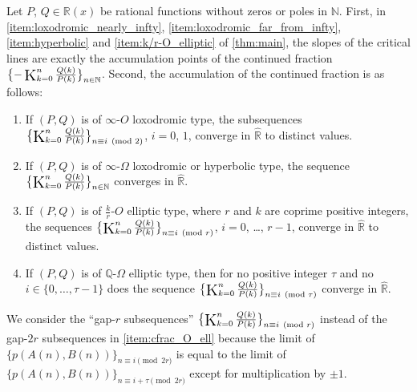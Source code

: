 \documentclass[a4paper,UKenglish,cleveref,autoref,thm-restate]{lipics-v2021}
\newcommand{\R}{\mathbb{R}}
\newcommand{\N}{\mathbb{N}}
\newcommand{\Q}{\mathbb{Q}}
\newcommand\Kettenbruch{\operatornamewithlimits{\mathchoice
     {\vcenter{\hbox{\huge $\mathrm{K}$}}}
     {\vcenter{\hbox{\Large $\mathrm{K}$}}}
     {\mathrm{K}}
     {\mathrm{K}}}}
\begin{document}
\begin{theorem}\label{thm:subcfrac_converge}
Let $P$, $Q \in \R(x)$ be rational functions without zeros or poles in $\N$. First, in \eqref{item:loxodromic_nearly_infty}, \eqref{item:loxodromic_far_from_infty}, \eqref{item:hyperbolic} and \eqref{item:k/r-O_elliptic} of \cref{thm:main}, the slopes of the critical lines are exactly the accumulation points of the continued fraction $\bigl\{ -\Kettenbruch _{k=0}^{n} \frac{Q(k)}{P(k)} \bigr\}_{n \in \N}$. Second, the accumulation of the continued fraction is as follows:
\begin{enumerate}[(1)]
\item \label{item:cfrac_O_lox}
If $(P, Q)$ is of $\infty$-$O$ loxodromic type, 
the subsequences
$\bigl\{ \Kettenbruch _{k=0}^{n} \frac{Q(k)}{P(k)} \bigr\}_{n \equiv i \pmod{2}}$, $i = 0$, $1$, converge in $\hat{\R}$ to 
distinct values. 

\item \label{item:cfrac_Omega_lox}
If $(P, Q)$ is of $\infty$-$\Omega$ loxodromic or hyperbolic type, 
the sequence $\bigl\{ \Kettenbruch _{k=0}^{n} \frac{Q(k)}{P(k)} \bigr\}_{n\in\N}$ converges in $\hat{\R}$. 

\item \label{item:cfrac_O_ell}
If $(P, Q)$ is of $\frac{k}r$-$O$ elliptic type, where $r$ and $k$ are coprime positive integers, 
the sequences $\bigl\{ \Kettenbruch _{k=0}^{n} \frac{Q(k)}{P(k)} \bigr\} _{n \equiv i \pmod{r}}$, $i = 0$, \ldots, $r-1$, converge in $\hat{\R}$ to distinct values.  

\item \label{item:cfrac_Omega_ell}
If $(P, Q)$ is of $\Q$-$\Omega$ elliptic type, 
then for no positive integer $\tau$ and no $i \in \{ 0, \dots, \tau - 1 \}$ does the sequence $\bigl\{ \Kettenbruch _{k=0}^{n} \frac{Q(k)}{P(k)} \bigr\}_{n \equiv i \pmod{\tau}}$ converge in $\hat{\R}$. 
\end{enumerate}
\end{theorem}

We consider the ``gap-$r$ subsequences'' $\bigl\{ \Kettenbruch _{k=0}^{n} \frac{Q(k)}{P(k)} \bigr\} _{n \equiv i \pmod{r}}$ instead of the gap-$2r$ subsequences in \eqref{item:cfrac_O_ell} 
because the limit of $\{ p(A(n), B(n)) \}_{n \equiv i \pmod{2r}}$ is equal to the limit of $\{ p(A(n), B(n)) \}_{n \equiv i+\tau \pmod{2r}}$ except for multiplication by $\pm1$.
\end{document}
